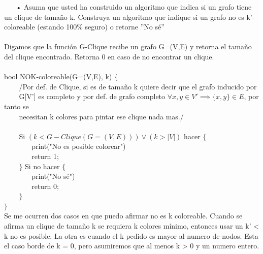 \documentclass[a4paper,12pt]{article}
\begin{document}
$ ~~~~~~ $ • Asuma que usted ha construido un algoritmo que indica si un grafo tiene un clique de tamaño k. Construya un algoritmo que indique si un grafo no es k'-coloreable (estando 100$\%$ seguro) o retorne ”No sé” \\
\\
Digamos que la función G-Clique recibe un grafo G=(V,E) y retorna el tamaño del clique encontrado. Retorna 0 en caso de no encontrar un clique.\\
\\
bool NOK-coloreable(G=(V,E), k) $\{$ \\
$~~~~~~~~$ /Por def. de Clique, si es de tamaño k quiere decir que el grafo inducido por \\
$~~~~~~~~$ G[V'] es completo y por def. de grafo completo $\forall x,y \in V' \implies \{x,y\} \in E$, por tanto se \\
$~~~~~~~~$ necesitan k colores para pintar ese clique nada mas./\\
$~~~~~~~~$ \\
$~~~~~~~~$ Si $(k < G-Clique(G=(V,E))) \vee (k > |V|)$ hacer $\{$ \\
$~~~~~~~~~~~~~~~~$ print("No es posible colorear")\\
$~~~~~~~~~~~~~~~~$ return 1;\\
$~~~~~~~~$ $\}$ Si no hacer $\{$\\
$~~~~~~~~~~~~~~~~$ print("No sé")\\
$~~~~~~~~~~~~~~~~$ return 0;\\
$~~~~~~~~$ $\}$ \\
$\}$ \\

Se me ocurren dos casos en que puedo afirmar no es k coloreable. Cuando se afirma un clique de tamaño k se requiera k colores mínimo, entonces usar un k' < k no es posible. La otra es cuando el k pedido es mayor al numero de nodos. Esta el caso borde de k = 0, pero asumiremos que al menos k > 0 y un numero entero.\\
\end{document}
